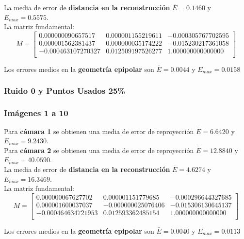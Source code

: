 \documentclass[a4paper, fontsize=11pt]{scrartcl} %
\numberwithin{equation}{section} %
\numberwithin{figure}{section} %
\numberwithin{table}{section} %
\begin{document}
	La media de error de \textbf{distancia en la reconstrucción} $\bar{E} = 0.1460$ y $E_{max} = 0.5575$.\\
	La matriz fundamental:
	\[
	M=
	\begin{bmatrix}
	0.000000090657517&	0.000001155219611&	-0.000305767702595 \\
	0.000001562381437&	0.000000035174222&	-0.015230217361058 \\
	-0.000463107270327&	0.012509197526277&	1.000000000000000  \\
	
	\end{bmatrix}
	\]
	
	Los errores medios en la \textbf{geometría epipolar} son $\bar{E} = 0.0044$ y $E_{max} = 0.0158$
	
	
	\subsubsection{Ruido 0 y Puntos Usados 25\%}
	
	\subsubsection*{Imágenes 1 a 10}
	
	Para \textbf{cámara 1} se obtienen una media de error de reproyección $\bar{E} = 6.6420$ y $E_{max} = 9.2430$.\\
	Para \textbf{cámara 2} se obtienen una media de error de reproyección $\bar{E} = 12.8840$ y $E_{max} = 40.0590$.\\
	
	La media de error de \textbf{distancia en la reconstrucción} $\bar{E} = 4.6274$ y $E_{max} = 16.3469$.\\
	La matriz fundamental:
	\[
	M=
	\begin{bmatrix}
	0.000000067627702&	0.000001151779685&	-0.000296644327685 \\
	0.000001600037037&	-0.000000025076406&	-0.015306130645137 \\
	-0.000464634721953&	0.012593362485154&	1.000000000000000  \\
	
	\end{bmatrix}
	\]
	
	Los errores medios en la \textbf{geometría epipolar} son $\bar{E} = 0.0040$ y $E_{max} = 0.0113$
	
\end{document}
